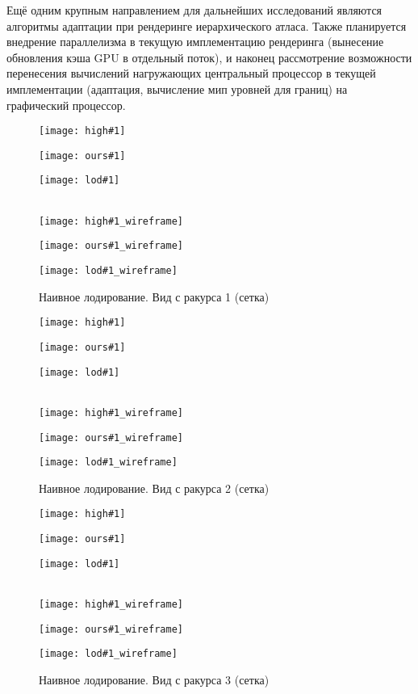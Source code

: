 \documentclass[12pt]{extarticle}
\begin{document}
Ещё одним крупным направлением для дальнейших исследований являются алгоритмы адаптации при рендеринге иерархического атласа. Также планируется внедрение параллелизма в текущую имплементацию рендеринга (вынесение обновления кэша GPU в отдельный поток), и наконец рассмотрение возможности перенесения вычислений нагружающих центральный процессор в текущей имплементации (адаптация, вычисление мип уровней для границ) на графический процессор.


\newcommand{\showpreviews}[1]{
  \begin{figure}
    \minipage{0.32\textwidth}
      \centering
      \texttt{[image: high\#1]}
      \caption{Оригинальная модель. Вид с ракурса #1}
      \label{fig:preview#1start}
    \endminipage\hfill
    \minipage{0.32\textwidth}
      \centering
      \texttt{[image: ours\#1]}
      \caption{Предлагаемый метод. Вид с ракурса #1}
    \endminipage\hfill
    \minipage{0.32\textwidth}
      \centering
      \texttt{[image: lod\#1]}
      \caption{Наивное лодирование. Вид с ракурса #1}
    \endminipage
    \\
    \minipage{0.32\textwidth}
      \centering
      \texttt{[image: high\#1\_wireframe]}
      \caption{Оригинальная модель. Вид с ракурса #1 (сетка)}
    \endminipage\hfill
    \minipage{0.32\textwidth}
      \centering
      \texttt{[image: ours\#1\_wireframe]}
      \caption{Предлагаемый метод. Вид с ракурса #1 (сетка)}
    \endminipage\hfill
    \minipage{0.32\textwidth}
      \centering
      \texttt{[image: lod\#1\_wireframe]}
      \caption{Наивное лодирование. Вид с ракурса #1 (сетка)}
      \label{fig:preview#1end}
    \endminipage
  \end{figure}
}

\showpreviews{1}
\showpreviews{2}
\showpreviews{3}


\newpage

\end{document}
